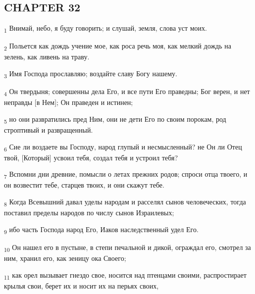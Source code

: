 \subsection{CHAPTER 32}
\begin{tcolorbox}
\textsubscript{1} Внимай, небо, я буду говорить; и слушай, земля, слова уст моих.
\end{tcolorbox}
\begin{tcolorbox}
\textsubscript{2} Польется как дождь учение мое, как роса речь моя, как мелкий дождь на зелень, как ливень на траву.
\end{tcolorbox}
\begin{tcolorbox}
\textsubscript{3} Имя Господа прославляю; воздайте славу Богу нашему.
\end{tcolorbox}
\begin{tcolorbox}
\textsubscript{4} Он твердыня; совершенны дела Его, и все пути Его праведны; Бог верен, и нет неправды [в Нем]; Он праведен и истинен;
\end{tcolorbox}
\begin{tcolorbox}
\textsubscript{5} но они развратились пред Ним, они не дети Его по своим порокам, род строптивый и развращенный.
\end{tcolorbox}
\begin{tcolorbox}
\textsubscript{6} Сие ли воздаете вы Господу, народ глупый и несмысленный? не Он ли Отец твой, [Который] усвоил тебя, создал тебя и устроил тебя?
\end{tcolorbox}
\begin{tcolorbox}
\textsubscript{7} Вспомни дни древние, помысли о летах прежних родов; спроси отца твоего, и он возвестит тебе, старцев твоих, и они скажут тебе.
\end{tcolorbox}
\begin{tcolorbox}
\textsubscript{8} Когда Всевышний давал уделы народам и расселял сынов человеческих, тогда поставил пределы народов по числу сынов Израилевых;
\end{tcolorbox}
\begin{tcolorbox}
\textsubscript{9} ибо часть Господа народ Его, Иаков наследственный удел Его.
\end{tcolorbox}
\begin{tcolorbox}
\textsubscript{10} Он нашел его в пустыне, в степи печальной и дикой, ограждал его, смотрел за ним, хранил его, как зеницу ока Своего;
\end{tcolorbox}
\begin{tcolorbox}
\textsubscript{11} как орел вызывает гнездо свое, носится над птенцами своими, распростирает крылья свои, берет их и носит их на перьях своих,
\end{tcolorbox}
